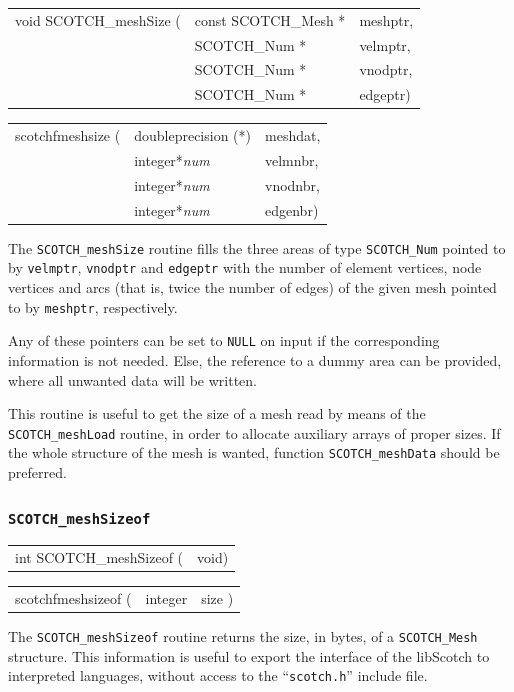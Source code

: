 \begin{itemize}
\progsyn

{\tt\begin{tabular}{l@{}ll}
void SCOTCH\_meshSize ( & const SCOTCH\_Mesh * & meshptr, \\
                        & SCOTCH\_Num *        & velmptr, \\
                        & SCOTCH\_Num *        & vnodptr, \\
                        & SCOTCH\_Num *        & edgeptr)
\end{tabular}}

{\tt\begin{tabular}{l@{}ll}
scotchfmeshsize ( & doubleprecision (*) & meshdat, \\
                  & integer*{\it num}   & velmnbr, \\
                  & integer*{\it num}   & vnodnbr, \\
                  & integer*{\it num}   & edgenbr)
\end{tabular}}

\progdes

The {\tt SCOTCH\_meshSize} routine fills the three areas of type
{\tt SCOTCH\_\lbt Num} pointed to by {\tt velmptr}, {\tt vnodptr}
and {\tt edgeptr} with the number of element vertices, node
vertices and arcs (that is, twice the number of edges) of the
given mesh pointed to by {\tt meshptr}, respectively.

Any of these pointers can be set to {\tt NULL} on input if the
corresponding information is not needed. Else, the reference to a
dummy area can be provided, where all unwanted data will be written.

This routine is useful to get the size of a mesh read by means
of the {\tt SCOTCH\_\lbt mesh\lbo Load} routine, in order to allocate
auxiliary arrays of proper sizes. If the whole structure of the
mesh is wanted, function {\tt SCOTCH\_mesh\lbo Data} should be
preferred.
\end{itemize}

\subsubsection{{\tt SCOTCH\_meshSizeof}}

\begin{itemize}
\progsyn

{\tt\begin{tabular}{l@{}l}
int SCOTCH\_meshSizeof ( & void)
\end{tabular}}

{\tt\begin{tabular}{l@{}ll}
scotchfmeshsizeof ( & integer & size )
\end{tabular}}

\progdes

The {\tt SCOTCH\_meshSizeof} routine returns the size, in bytes, of a
{\tt SCOTCH\_\lbt Mesh} structure. This information is useful to
export the interface of the {\sc libScotch} to interpreted languages,
without access to the ``{\tt scotch.h}'' include file.
\end{itemize}

